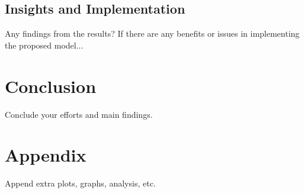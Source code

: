 \documentclass[10pt, letterpaper] {article}
\begin{document}
\subsection{Insights and Implementation}
Any findings from the results? If there are any benefits or issues in implementing the proposed model...
\section{Conclusion}
Conclude your efforts and main findings.

 

\section{Appendix}
Append extra plots, graphs, analysis, etc.
\end{document}
